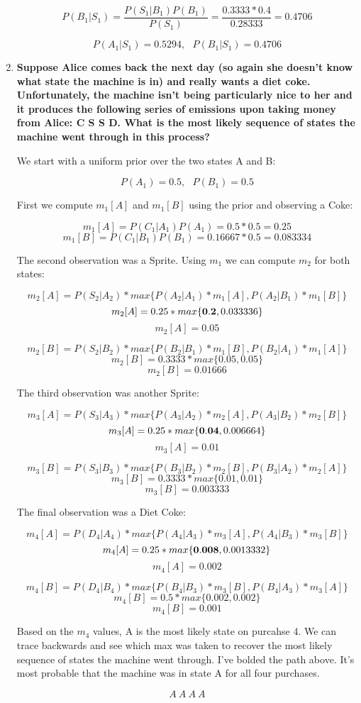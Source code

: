 \documentclass[fleqn]{hermans-hw}
\begin{document}
\begin{enumerate}
  $$P(B_1 | S_1) = \frac{P(S_1 | B_1) P(B_1)}{P(S_1)} = \frac{0.3333 * 0.4}{0.28333} = 0.4706$$
  
  $$\boxed{P(A_1 | S_1) = 0.5294, \ \ \ P(B_1 | S_1) = 0.4706}$$

\item {\bf Suppose Alice comes back the next day (so again she doesn't know
  what state the machine is in) and really wants a diet coke.
  Unfortunately, the machine isn't being particularly nice to her and
  it produces the following series of emissions upon taking money from
  Alice: C S S D.  What is the most likely sequence of states the
  machine went through in this process?}
  
  We start with a uniform prior over the two states A and B:
  
  $$P(A_1) = 0.5, \ \ \ P(B_1) = 0.5$$
  
  First we compute $m_1[A]$ and $m_1[B]$ using the prior and observing a Coke:
  
  $$m_1[A] = P(C_1 | A_1)P(A_1) = 0.5 * 0.5 = 0.25$$
  $$m_1[B] = P(C_1 | B_1)P(B_1) = 0.16667 * 0.5 = 0.083334$$
  
  The second observation was a Sprite. Using $m_1$ we can compute $m_2$ for both states:
  
  $$m_2[A] = P(S_2 | A_2) * max\{P(A_2 | A_1) * m_1[A], P(A_2 | B_1) * m_1[B]\}$$
  $$m_2[A] = 0.25 * max\{{\bf 0.2}, 0.033336\}$$
  $$m_2[A] = 0.05$$
  
  $$m_2[B] = P(S_2 | B_2) * max\{P(B_2 | B_1) * m_1[B], P(B_2 | A_1) * m_1[A]\}$$
  $$m_2[B] = 0.3333 * max\{0.05, 0.05\}$$
  $$m_2[B] = 0.01666$$
  
  The third observation was another Sprite:
  
  $$m_3[A] = P(S_3 | A_3) * max\{P(A_3 | A_2) * m_2[A], P(A_3 | B_2) * m_2[B]\}$$
  $$m_3[A] = 0.25 * max\{{\bf 0.04}, 0.006664\}$$
  $$m_3[A] = 0.01$$
  
  $$m_3[B] = P(S_3 | B_3) * max\{P(B_3 | B_2) * m_2[B], P(B_3 | A_2) * m_2[A]\}$$
  $$m_3[B] = 0.3333 * max\{0.01, 0.01\}$$
  $$m_3[B] = 0.003333$$
  
  The final observation was a Diet Coke:
  
  $$m_4[A] = P(D_4 | A_4) * max\{P(A_4 | A_3) * m_3[A], P(A_4 | B_3) * m_3[B]\}$$
  $$m_4[A] = 0.25 * max\{{\bf 0.008}, 0.0013332\}$$
  $$m_4[A] = 0.002$$
  
  $$m_4[B] = P(D_4 | B_4) * max\{P(B_4 | B_3) * m_3[B], P(B_4 | A_3) * m_3[A]\}$$
  $$m_4[B] = 0.5 * max\{0.002, 0.002\}$$
  $$m_4[B] = 0.001$$
  
  Based on the $m_4$ values, A is the most likely state on purcahse 4. We can trace backwards and see which max was taken to recover the most likely sequence of states the machine went through. I've bolded the path above. It's most probable that the machine was in state A for all four purchases.
  
  $$\boxed{A \ A \ A \ 
  A}$$
\end{enumerate}
\end{document}
